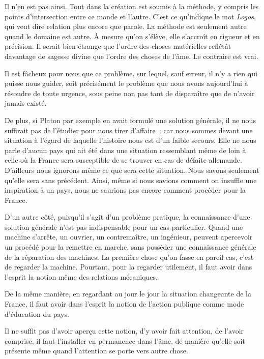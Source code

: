 \documentclass[french,twoside]{book} %
\begin{document}
Il n'en est pas ainsi. Tout dans la création est soumis à la méthode, y compris les points d'intersection entre ce monde et l'autre. C'est ce qu'indique le mot {\itshape Logos}, qui veut dire relation plus encore que parole. La méthode est seulement autre quand le domaine est autre. À mesure qu'on s'élève, elle s'accroît en rigueur et en précision. Il serait bien étrange que l'ordre des choses matérielles reflétât davantage de sagesse divine que l'ordre des choses de l'âme. Le contraire est vrai.\par
Il est fâcheux pour nous que ce problème, sur lequel, sauf erreur, il n'y a rien qui puisse nous guider, soit précisément le problème que nous avons aujourd'hui à résoudre de toute urgence, sous peine non pas tant de disparaître que de n'avoir jamais existé.\par
De plus, si Platon par exemple en avait formulé une solution générale, il ne nous suffirait pas de l'étudier pour nous tirer d'affaire ; car nous sommes devant une situation à l'égard de laquelle l'histoire nous est d'un faible secours. Elle ne nous parle d'aucun pays qui ait été dans une situation ressemblant même de loin à celle où la France sera susceptible de se trouver en cas de défaite allemande. D'ailleurs nous ignorons même ce que sera cette situation. Nous savons seulement qu'elle sera sans précédent. Ainsi, même si nous savions comment on insuffle une inspiration à un pays, nous ne saurions pas encore comment procéder pour la France.\par
D'un autre côté, puisqu'il s'agit d'un problème pratique, la connaissance d'une solution générale n'est pas indispensable pour un cas particulier. Quand une machine s'arrête, un ouvrier, un contremaître, un ingénieur, peuvent apercevoir un procédé pour la remettre en marche, sans posséder une connaissance générale de la réparation des machines. La première chose qu'on fasse en pareil cas, c'est de regarder la machine. Pourtant, pour la regarder utilement, il faut avoir dans l'esprit la notion même des relations mécaniques.\par
De la même manière, en regardant au jour le jour la situation changeante de la France, il faut avoir dans l'esprit la notion de l'action publique comme mode d'éducation du pays.\par
Il ne suffit pas d'avoir aperçu cette notion, d'y avoir fait attention, de l'avoir comprise, il faut l'installer en permanence dans l'âme, de manière qu'elle soit présente même quand l'attention se porte vers autre chose.\par
\end{document}
